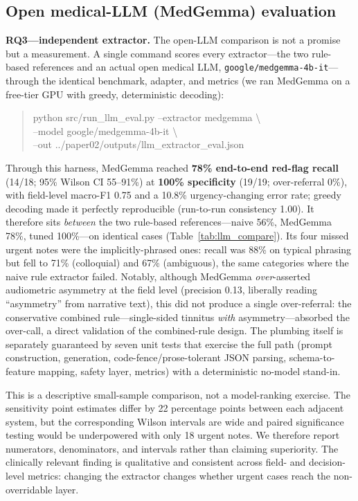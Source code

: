 \documentclass[11pt]{article}
\begin{document}


\subsection{Open medical-LLM (MedGemma) evaluation}
\textbf{RQ3---independent extractor.} The open-LLM comparison is not a promise but a measurement. A single command scores every extractor---the two rule-based references and an actual open medical LLM, \texttt{google/medgemma-4b-it}---through the identical benchmark, adapter, and metrics (we ran MedGemma on a free-tier GPU with greedy, deterministic decoding):
\begin{quote}\footnotesize\ttfamily
python src/run\_llm\_eval.py --extractor medgemma \textbackslash\\
\phantom{xx}--model google/medgemma-4b-it \textbackslash\\
\phantom{xx}--out ../paper02/outputs/llm\_extractor\_eval.json
\end{quote}

Through this harness, MedGemma reached \textbf{78\% end-to-end red-flag recall} (14/18; 95\% Wilson CI 55--91\%) at \textbf{100\% specificity} (19/19; over-referral 0\%), with field-level macro-F1 0.75 and a 10.8\% urgency-changing error rate; greedy decoding made it perfectly reproducible (run-to-run consistency 1.00). It therefore sits \emph{between} the two rule-based references---naive 56\%, MedGemma 78\%, tuned 100\%---on identical cases (Table~\ref{tab:llm_compare}). Its four missed urgent notes were the implicitly-phrased ones: recall was 88\% on typical phrasing but fell to 71\% (colloquial) and 67\% (ambiguous), the same categories where the naive rule extractor failed. Notably, although MedGemma \emph{over}-asserted audiometric asymmetry at the field level (precision 0.13, liberally reading ``asymmetry'' from narrative text), this did not produce a single over-referral: the conservative combined rule---single-sided tinnitus \emph{with} asymmetry---absorbed the over-call, a direct validation of the combined-rule design. The plumbing itself is separately guaranteed by seven unit tests that exercise the full path (prompt construction, generation, code-fence/prose-tolerant JSON parsing, schema-to-feature mapping, safety layer, metrics) with a deterministic no-model stand-in.

This is a descriptive small-sample comparison, not a model-ranking exercise. The sensitivity point estimates differ by 22 percentage points between each adjacent system, but the corresponding Wilson intervals are wide and paired significance testing would be underpowered with only 18 urgent notes. We therefore report numerators, denominators, and intervals rather than claiming superiority. The clinically relevant finding is qualitative and consistent across field- and decision-level metrics: changing the extractor changes whether urgent cases reach the non-overridable layer.
\end{document}
